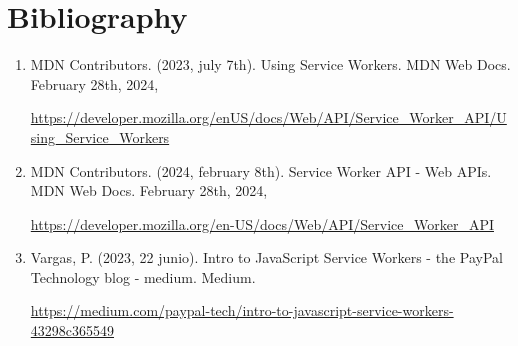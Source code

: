 \documentclass[12pt,a4paper]{article}
\begin{document}
    \clearpage

	\section{Bibliography}

    \begin{enumerate}
    
      \item MDN Contributors. (2023, july 7th). Using Service Workers. MDN Web Docs.
      February 28th, 2024,
      
    \href{https://developer.mozilla.org/enUS/docs/Web/API/Service_Worker_API/Using_Service_Workers}{https://developer.mozilla.org/enUS/docs/Web/API/Service_Worker_API/Using_Service_Workers}

      \item MDN Contributors. (2024, february 8th). Service Worker API - Web APIs. MDN
        Web Docs. February 28th, 2024,
        
      \href{https://developer.mozilla.org/en-US/docs/Web/API/Service_Worker_API}{https://developer.mozilla.org/en-US/docs/Web/API/Service_Worker_API}

      \item Vargas, P. (2023, 22 junio). Intro to JavaScript Service Workers - the PayPal Technology blog - medium. Medium.
      
      \href{https://medium.com/paypal-tech/intro-to-javascript-service-workers-43298c365549}{https://medium.com/paypal-tech/intro-to-javascript-service-workers-43298c365549}
      
    \end{enumerate}
	
	
\end{document}
